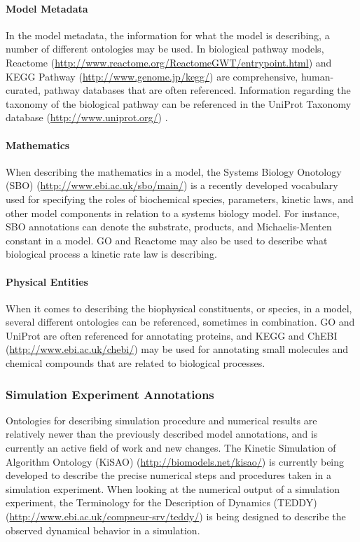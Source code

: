 \documentclass[]{article}
\begin{document}
\paragraph{Model Metadata}

In the model metadata, the information for what the model is describing,
a number of different ontologies may be used. In biological pathway
models, Reactome
(\url{http://www.reactome.org/ReactomeGWT/entrypoint.html})
\autocite{joshi2005reactome} and KEGG Pathway
(\url{http://www.genome.jp/kegg/}) \autocite{ogata1999kegg} are
comprehensive, human-curated, pathway databases that are often
referenced. Information regarding the taxonomy of the biological pathway
can be referenced in the UniProt Taxonomy database
(\url{http://www.uniprot.org/}) \autocite{bairoch2005universal}.

\paragraph{Mathematics}

When describing the mathematics in a model, the Systems Biology
Onotology (SBO) (\url{http://www.ebi.ac.uk/sbo/main/})
\autocite{le2006model} is a recently developed vocabulary used for
specifying the roles of biochemical species, parameters, kinetic laws,
and other model components in relation to a systems biology model. For
instance, SBO annotations can denote the substrate, products, and
Michaelis-Menten constant in a model. GO and Reactome may also be used
to describe what biological process a kinetic rate law is describing.

\paragraph{Physical Entities}

When it comes to describing the biophysical constituents, or species, in
a model, several different ontologies can be referenced, sometimes in
combination. GO and UniProt are often referenced for annotating
proteins, and KEGG and ChEBI (\url{http://www.ebi.ac.uk/chebi/})
\autocite{degtyarenko2008chebi} may be used for annotating small
molecules and chemical compounds that are related to biological
processes.

\subsubsection{Simulation Experiment Annotations}

Ontologies for describing simulation procedure and numerical results are
relatively newer than the previously described model annotations, and is
currently an active field of work and new changes. The Kinetic
Simulation of Algorithm Ontology (KiSAO)
(\url{http://biomodels.net/kisao/}) is currently being developed to
describe the precise numerical steps and procedures taken in a
simulation experiment. When looking at the numerical output of a
simulation experiment, the Terminology for the Description of Dynamics
(TEDDY) (\url{http://www.ebi.ac.uk/compneur-srv/teddy/})
\autocite{courtot2011controlled} is being designed to describe the
observed dynamical behavior in a simulation.
\end{document}

